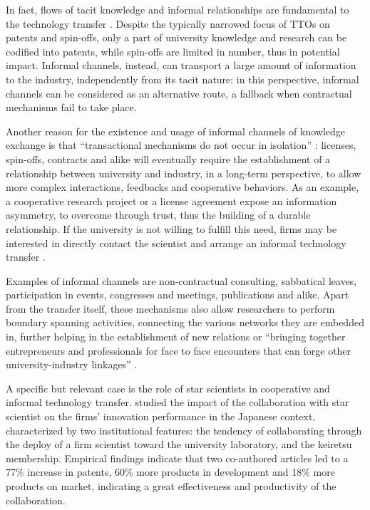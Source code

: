 In fact, flows of tacit knowledge and informal relationships are fundamental to the technology transfer \citep{Geuna2009}. Despite the typically narrowed focus of TTOs on patents and spin-offs, only a part of university knowledge and research can be codified into patents, while spin-offs are limited in number, thus in potential impact. Informal channels, instead, can transport a large amount of information to the industry, independently from its tacit nature: in this perspective, informal channels can be considered as an alternative route, a fallback when contractual mechanisms fail to take place.

Another reason for the existence and usage of informal channels of knowledge exchange is that \enquote{transactional mechanisms do not occur in isolation} \citep{Bercovitz2006}: licenses, spin-offs, contracts and alike will eventually require the establishment of a relationship between university and industry, in a long-term perspective, to allow more complex interactions, feedbacks and cooperative behaviors. As an example, a cooperative research project or a license agreement expose an information asymmetry, to overcome through trust, thus the building of a durable relationship. If the university is not willing to fulfill this need, firms may be interested in directly contact the scientist and arrange an informal technology transfer \citep{Siegel2003a, Link2007}. 

Examples of informal channels are non-contractual consulting, sabbatical leaves, participation in events, congresses and meetings, publications and alike. Apart from the transfer itself, these mechanisms also allow researchers to perform boundary spanning activities, connecting the various networks they are embedded in, further helping in the establishment of new relations or \enquote{bringing together entrepreneurs and professionals for face to face encounters that can forge other university-industry linkages} \citep{Yusuf2008}.

A specific but relevant case is the role of star scientists in cooperative and informal technology transfer. \citet{Zucker2001} studied the impact of the collaboration with star scientist on the firms' innovation performance in the Japanese context, characterized by two institutional features: the tendency of collaborating through the deploy of a firm scientist toward the university laboratory, and the keiretsu membership. Empirical findings indicate that two co-authored articles led to a 77\% increase in patents, 60\% more products in development and 18\% more products on market, indicating a great effectiveness and productivity of the collaboration.

